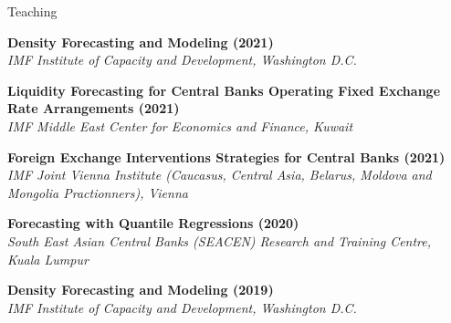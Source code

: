 \documentclass[usegeometry, 10pt, a4paper]{cv} %
\newcommand{\activite}[1]{\textbf{#1}\ }
\begin{document}
\begin{rubriquetableau}[0.95\textwidth]{Teaching}


\small
\activite{Density Forecasting and Modeling (2021)} \\
\hspace{0.6cm} \small{\emph{IMF Institute of Capacity and Development, Washington D.C.}}
\vspace{0.3cm}

  
\small
\activite{Liquidity Forecasting for Central Banks Operating Fixed Exchange Rate Arrangements (2021)} \\
\hspace{0.6cm} \small{\emph{IMF Middle East Center for Economics and Finance, Kuwait}}
\vspace{0.3cm}

\small
\activite{Foreign Exchange Interventions Strategies for Central Banks (2021)} \\
\hspace{0.6cm} \small{\emph{IMF Joint Vienna Institute (Caucasus, Central
    Asia, Belarus, Moldova and Mongolia Practionners), Vienna}}
\vspace{0.3cm}

\small
\activite{Forecasting with Quantile Regressions (2020)} \\
\hspace{0.6cm} \small{\emph{South East Asian Central Banks (SEACEN) Research and Training Centre, Kuala Lumpur}}
\vspace{0.3cm}
  
\small
\activite{Density Forecasting and Modeling (2019)} \\
\hspace{0.6cm} \small{\emph{IMF Institute of Capacity and Development, Washington D.C.}}
\vspace{0.3cm}


\end{rubriquetableau}
\end{document}
